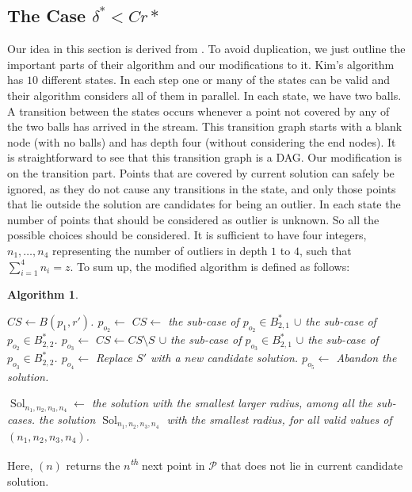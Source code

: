 \documentclass[envcountsame]{cls/cccg15}
\newtheorem{algorithm}{Algorithm}
\newcommand{\nth}{\textsuperscript{\textit{th}} }
\newcommand{\set}[1]{\left\{ #1 \right\}}
\newcommand{\provided}{\,:\,}
\begin{document}
\subsection{The Case $\delta^* < C r*$}
\label{subsec:smaller}
Our idea in this section is derived from \cite[Sec.~3.1]{ahn2014computing, kim2014improved}. To avoid duplication, we just outline the important parts of their algorithm and our modifications to it. Kim's algorithm has $10$ different states. In each step one or many of the states can be valid and their algorithm considers all of them in parallel. In each state, we have two balls. A transition between the states occurs whenever a point not covered by any of the two balls has arrived in the stream. This transition graph starts with a blank node (with no balls) and has depth four (without considering the end nodes). It is straightforward to see that this transition graph is a DAG.
Our modification is on the transition part.
Points that are covered by current solution can safely be ignored, as they do not cause any transitions in the state, and only those points that lie outside the solution are candidates for being an outlier.
In each state the number of points that should be considered as outlier is unknown. So all the possible choices should be considered. It is sufficient to have four integers, $n_1,\dots, n_4$ representing the number of outliers in depth $1$ to $4$, such that $\sum_{i=1}^{4} n_i=z$. To sum up, the modified algorithm is defined as follows:
\begin{algorithm}
\label{alg:smallc}
\leavevmode
\begin{algorithmic}
	\For{$(n_1, \dots, n_4) \gets \set{(n_1, \dots, n_4) \provided \sum n_i=z}$}
		\State $CS \gets B(p_1,r')$.
		\State $p_{o_2} \gets $ 
			\State $CS\gets$ the sub-case of $p_{o_2} \in B_{2, 1}^*$ $\cup$ the sub-case of $p_{o_2} \in B_{2,2}^*$.
				\State $p_{o_3} \gets$ 
					\State $CS\gets CS\setminus S$ $\cup$ the sub-case of $p_{o_3} \in B_{2, 1}^*$ $\cup$ the sub-case of $p_{o_3} \in B_{2,2}^*$.
						\State $p_{o_4} \gets$ 
							\State Replace $S'$ with a new candidate solution.
							\State $p_{o_5} \gets$ 
								\State Abandon the solution.
							\EndIf
						\EndIf
					\EndFor
				\EndIf
			\EndFor

		\EndIf
		\State $\mathop{Sol}_{n_1,n_2,n_3,n_4} \gets$ the solution with the smallest larger radius, among all the sub-cases.
	\EndFor
	\State \Return the solution $\mathop{Sol}_{n_1,n_2,n_3,n_4}$ with the smallest radius, for all valid values of $(n_1,n_2,n_3,n_4)$.
\EndFunction
\end{algorithmic}
\end{algorithm}
Here, $(n)$ returns the $n$\nth next point in $\mathcal{P}$ that does not lie in current candidate solution.
\end{document}
